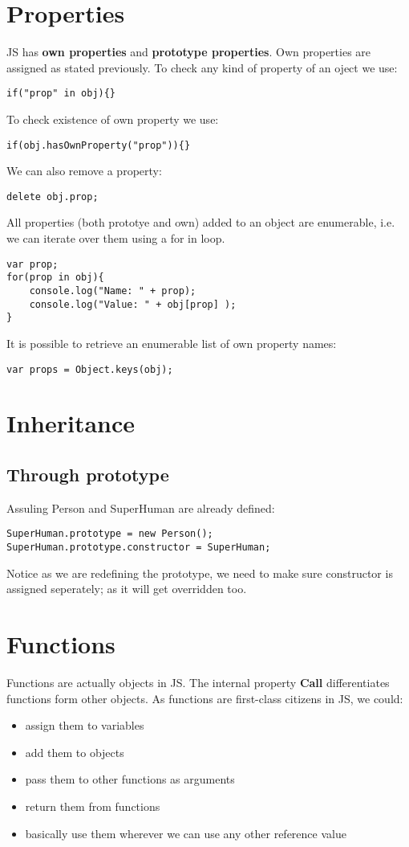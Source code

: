 \documentclass[12pt, a4paper]{article}
\begin{document}
\section{Properties}
JS has \textbf{own properties} and \textbf{prototype properties}. Own properties are assigned as stated previously.
To check any kind of property of an oject we use:
\begin{verbatim}
if("prop" in obj){}
\end{verbatim}
To check existence of own property we use:
\begin{verbatim}
if(obj.hasOwnProperty("prop")){}
\end{verbatim}
We can also remove a property:
\begin{verbatim}
delete obj.prop;
\end{verbatim}
All properties (both prototye and own) added to an object are enumerable,
i.e. we can iterate over them using a for in loop.
\begin{verbatim}
var prop;
for(prop in obj){
    console.log("Name: " + prop);
    console.log("Value: " + obj[prop] );   
}
\end{verbatim}
It is possible to retrieve an enumerable list of own property names:
\begin{verbatim}
var props = Object.keys(obj);
\end{verbatim}

\section{Inheritance}
\subsection{Through prototype}
Assuling Person and SuperHuman are already defined:
\begin{verbatim}
SuperHuman.prototype = new Person();
SuperHuman.prototype.constructor = SuperHuman;
\end{verbatim}
Notice as we are redefining the prototype, we need to make sure constructor is
assigned seperately; as it will get overridden too.

\section{Functions}
Functions are actually objects in JS. The internal property \textbf{Call} differentiates functions form other objects. As functions are first-class citizens in JS, we could:
\begin{itemize}
\item assign them to variables
\item add them to objects
\item pass them to other functions as arguments
\item return them from functions
\item basically use them wherever we can use any other reference value
\end{itemize}
\end{document}
